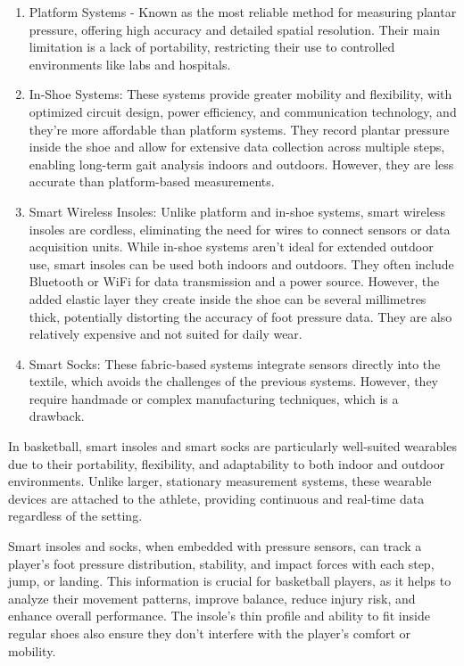 \begin{enumerate}
  \item Platform Systems - Known as the most reliable method for measuring plantar pressure, offering high accuracy and detailed spatial resolution. Their main limitation is a lack of portability, restricting their use to controlled environments like labs and hospitals.
  \item In-Shoe Systems: These systems provide greater mobility and flexibility, with optimized circuit design, power efficiency, and communication technology, and they're more affordable than platform systems. They record plantar pressure inside the shoe and allow for extensive data collection across multiple steps, enabling long-term gait analysis indoors and outdoors. However, they are less accurate than platform-based measurements.
  \item Smart Wireless Insoles: Unlike platform and in-shoe systems, smart wireless insoles are cordless, eliminating the need for wires to connect sensors or data acquisition units. While in-shoe systems aren't ideal for extended outdoor use, smart insoles can be used both indoors and outdoors. They often include Bluetooth or WiFi for data transmission and a power source. However, the added elastic layer they create inside the shoe can be several millimetres thick, potentially distorting the accuracy of foot pressure data. They are also relatively expensive and not suited for daily wear.
  \item Smart Socks: These fabric-based systems integrate sensors directly into the textile, which avoids the challenges of the previous systems. However, they require handmade or complex manufacturing techniques, which is a drawback.
\end{enumerate}

In basketball, smart insoles and smart socks are particularly well-suited wearables due to their portability, flexibility, and adaptability to both indoor and outdoor environments. 
Unlike larger, stationary measurement systems, these wearable devices are attached to the athlete, providing continuous and real-time data regardless of the setting.

Smart insoles and socks, when embedded with pressure sensors, can track a player's foot pressure distribution, stability, and impact forces with each step, jump, or landing. This information 
is crucial for basketball players, as it helps to analyze their movement patterns, improve balance, reduce injury risk, and enhance overall performance. The insole's thin profile and 
ability to fit inside regular shoes also ensure they don't interfere with the player's comfort or mobility.

